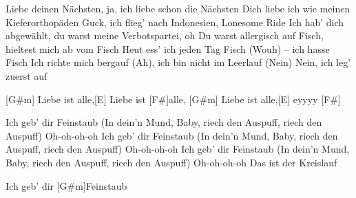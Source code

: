 \begin{guitar}
	Liebe deinen Nächsten, ja, ich liebe schon die Nächsten
	Dich liebe ich wie meinen Kieferorthopäden
	Guck, ich flieg' nach Indonesien, Lonesome Ride
	Ich hab' dich abgewählt, du warst meine Verbotspartei, oh
	Du warst allergisch auf Fisch, hieltest mich ab vom Fisch
	Heut ess' ich jeden Tag Fisch (Wouh) – ich hasse Fisch
	Ich richte mich bergauf (Ah), ich bin nicht im Leerlauf (Nein)
	Nein, ich leg' zuerst auf
	
	[G#m] Liebe ist alle,[E] Liebe ist [F#]alle, 
	[G#m] Liebe ist alle,[E] eyyyy [F#]{}
	
	Ich geb' dir Feinstaub
	(In dein'n Mund, Baby, riech den Auspuff, riech den Auspuff) Oh-oh-oh-oh
	Ich geb' dir Feinstaub
	(In dein'n Mund, Baby, riech den Auspuff, riech den Auspuff) Oh-oh-oh-oh
	Ich geb' dir Feinstaub
	(In dein'n Mund, Baby, riech den Auspuff, riech den Auspuff) Oh-oh-oh-oh
	Das ist der Kreislauf
	
	Ich geb' dir [G#m]Feinstaub
\end{guitar}
